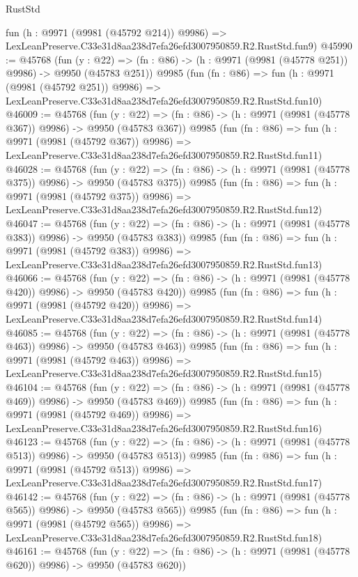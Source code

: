 \begin{lexlean}{RustStd}
\begin{coremodule}
    fun (h : @9971 (@9981 (@45792 @214)) @9986) =>
    LexLeanPreserve.C33e31d8aa238d7efa26efd3007950859.R2.RustStd.fun9)
@45990 := @45768
    (fun (y : @22) => (fn : @86) -> (h : @9971 (@9981 (@45778 @251)) @9986) -> @9950 (@45783 @251))
    @9985
    (fun (fn : @86) =>
    fun (h : @9971 (@9981 (@45792 @251)) @9986) =>
    LexLeanPreserve.C33e31d8aa238d7efa26efd3007950859.R2.RustStd.fun10)
@46009 := @45768
    (fun (y : @22) => (fn : @86) -> (h : @9971 (@9981 (@45778 @367)) @9986) -> @9950 (@45783 @367))
    @9985
    (fun (fn : @86) =>
    fun (h : @9971 (@9981 (@45792 @367)) @9986) =>
    LexLeanPreserve.C33e31d8aa238d7efa26efd3007950859.R2.RustStd.fun11)
@46028 := @45768
    (fun (y : @22) => (fn : @86) -> (h : @9971 (@9981 (@45778 @375)) @9986) -> @9950 (@45783 @375))
    @9985
    (fun (fn : @86) =>
    fun (h : @9971 (@9981 (@45792 @375)) @9986) =>
    LexLeanPreserve.C33e31d8aa238d7efa26efd3007950859.R2.RustStd.fun12)
@46047 := @45768
    (fun (y : @22) => (fn : @86) -> (h : @9971 (@9981 (@45778 @383)) @9986) -> @9950 (@45783 @383))
    @9985
    (fun (fn : @86) =>
    fun (h : @9971 (@9981 (@45792 @383)) @9986) =>
    LexLeanPreserve.C33e31d8aa238d7efa26efd3007950859.R2.RustStd.fun13)
@46066 := @45768
    (fun (y : @22) => (fn : @86) -> (h : @9971 (@9981 (@45778 @420)) @9986) -> @9950 (@45783 @420))
    @9985
    (fun (fn : @86) =>
    fun (h : @9971 (@9981 (@45792 @420)) @9986) =>
    LexLeanPreserve.C33e31d8aa238d7efa26efd3007950859.R2.RustStd.fun14)
@46085 := @45768
    (fun (y : @22) => (fn : @86) -> (h : @9971 (@9981 (@45778 @463)) @9986) -> @9950 (@45783 @463))
    @9985
    (fun (fn : @86) =>
    fun (h : @9971 (@9981 (@45792 @463)) @9986) =>
    LexLeanPreserve.C33e31d8aa238d7efa26efd3007950859.R2.RustStd.fun15)
@46104 := @45768
    (fun (y : @22) => (fn : @86) -> (h : @9971 (@9981 (@45778 @469)) @9986) -> @9950 (@45783 @469))
    @9985
    (fun (fn : @86) =>
    fun (h : @9971 (@9981 (@45792 @469)) @9986) =>
    LexLeanPreserve.C33e31d8aa238d7efa26efd3007950859.R2.RustStd.fun16)
@46123 := @45768
    (fun (y : @22) => (fn : @86) -> (h : @9971 (@9981 (@45778 @513)) @9986) -> @9950 (@45783 @513))
    @9985
    (fun (fn : @86) =>
    fun (h : @9971 (@9981 (@45792 @513)) @9986) =>
    LexLeanPreserve.C33e31d8aa238d7efa26efd3007950859.R2.RustStd.fun17)
@46142 := @45768
    (fun (y : @22) => (fn : @86) -> (h : @9971 (@9981 (@45778 @565)) @9986) -> @9950 (@45783 @565))
    @9985
    (fun (fn : @86) =>
    fun (h : @9971 (@9981 (@45792 @565)) @9986) =>
    LexLeanPreserve.C33e31d8aa238d7efa26efd3007950859.R2.RustStd.fun18)
@46161 := @45768
    (fun (y : @22) => (fn : @86) -> (h : @9971 (@9981 (@45778 @620)) @9986) -> @9950 (@45783 @620))

\end{coremodule}
\end{lexlean}
